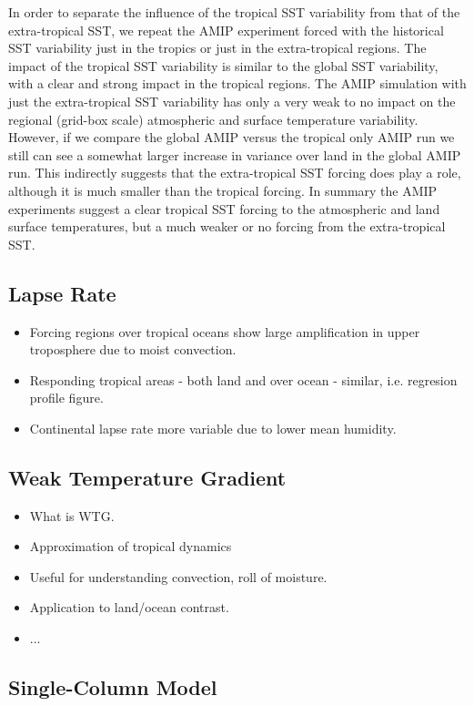 In order to separate the influence of the tropical SST variability from that of 
the extra-tropical SST, we repeat the AMIP experiment forced with the historical 
SST variability just in the tropics or just in the extra-tropical regions. The 
impact of the tropical SST variability is similar to the global SST variability, 
with a clear and strong impact in the tropical regions.  The AMIP simulation 
with just the extra-tropical SST variability has only a very weak to no impact 
on the regional (grid-box scale) atmospheric and surface temperature 
variability.  However, if we compare the global AMIP versus the tropical only 
AMIP run we still can see a somewhat larger increase in variance over land in 
the global AMIP run. This indirectly suggests that the extra-tropical SST 
forcing does play a role, although it is much smaller than the tropical forcing.  
In summary the AMIP experiments suggest a clear tropical SST forcing to the 
atmospheric and land surface temperatures, but a much weaker or no forcing from 
the extra-tropical SST.


\subsection{Lapse Rate}
\begin{itemize}
	\item Forcing regions over tropical oceans show large amplification in upper 
		troposphere due to moist convection.
	\item Responding tropical areas - both land and over ocean - similar, i.e.  
		regresion profile figure.
	\item Continental lapse rate more variable due to lower mean humidity.
\end{itemize}


\subsection{Weak Temperature Gradient}
\begin{itemize}
	\item What is WTG.
	\item Approximation of tropical dynamics
	\item Useful for understanding convection, roll of moisture.
	\item Application to land/ocean contrast.
	\item ...
\end{itemize}

\subsection{Single-Column Model}
